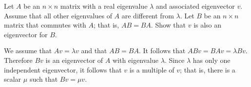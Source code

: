 \documentclass{ximera}
\begin{document}
\begin{exercise} \label{c10.3.6A}
Let $A$ be an $n\times n$ matrix with a real eigenvalue $\lambda$ and 
associated eigenvector $v$.  Assume that all other eigenvalues of $A$ are
different from $\lambda$.  Let $B$ be an $n\times n$ matrix that commutes
with $A$; that is, $AB=BA$.  Show that $v$ is also an eigenvector for $B$.

\begin{solution}
We assume that $Av=\lambda v$ and that $AB=BA$.  It follows that 
$ABv=BAv=\lambda Bv$.  Therefore $Bv$ is an eigenvector of $A$ with eigenvalue
$\lambda$.  Since $\lambda$ has only one independent eigenvector, it follows that 
$v$ is a multiple of $v$; that is, there is a scalar $\mu$ such that $Bv=\mu v$.

\end{solution}
\end{exercise}
\end{document}
